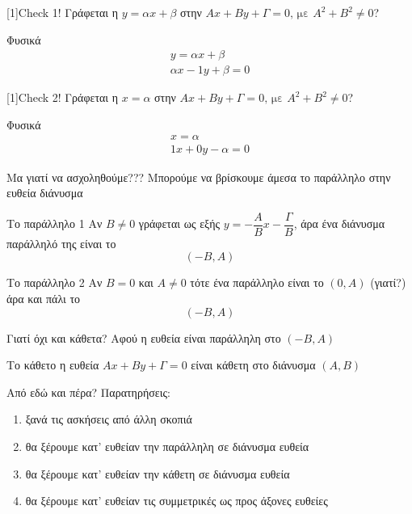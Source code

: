 \documentclass[greek]{beamer}
\begin{document}
\begin{frame}{\scalebox{-1}[1]{Check 1!}}
  Γράφεται η $y=αx+β$ στην $Αx+Βy+Γ=0 \text{, με } Α^2+Β^2\ne 0$?

   Φυσικά
  \begin{align*}
    y=αx+β \\
    αx-1y+β=0
  \end{align*}
\end{frame}

\begin{frame}{\scalebox{-1}[1]{Check 2!}}
  Γράφεται η $x=α$ στην $Αx+Βy+Γ=0 \text{, με } Α^2+Β^2\ne 0$?

   Φυσικά
  \begin{align*}
    x=α \\
    1x+0y-α=0
  \end{align*}
\end{frame}

\begin{frame}{Μα γιατί να ασχοληθούμε???}
  Μπορούμε να βρίσκουμε άμεσα το παράλληλο στην ευθεία διάνυσμα
  \begin{block}{Το παράλληλο 1}
    Αν $Β\ne 0$ γράφεται ως εξής $y=-\dfrac{Α}{Β}x-\dfrac{Γ}{Β}$, άρα ένα διάνυσμα παράλληλό της είναι το $$(-Β,Α)$$
  \end{block}
  \begin{block}{Το παράλληλο 2}
    Αν $Β= 0$ και $Α\ne 0$ τότε ένα παράλληλο είναι το $(0,Α)$ (γιατί?) άρα και πάλι το $$(-Β,Α)$$
  \end{block}
\end{frame}

\begin{frame}{Γιατί όχι και κάθετα?}
  Αφού η ευθεία είναι παράλληλη στο $(-Β,Α)$
  \begin{block}{Το κάθετο}
    η ευθεία $Αx+Βy+Γ=0$ είναι κάθετη στο διάνυσμα $(Α,Β)$
  \end{block}

\end{frame}

\begin{frame}{Από εδώ και πέρα?}
  Παρατηρήσεις:
  \begin{enumerate}
    \item<1-> ξανά τις ασκήσεις από άλλη σκοπιά
    \item<2-> θα ξέρουμε κατ' ευθείαν την παράλληλη σε διάνυσμα ευθεία
    \item<3-> θα ξέρουμε κατ' ευθείαν την κάθετη σε διάνυσμα ευθεία
    \item<4-> θα ξέρουμε κατ' ευθείαν τις συμμετρικές ως προς άξονες ευθείες
  \end{enumerate}
\end{frame}
\end{document}
